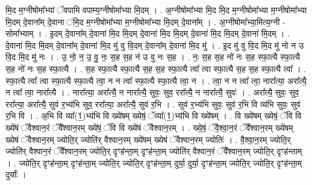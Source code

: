 \documentclass[17pt]{extarticle}
\begin{document}
मि॒द म॒ग्नीषोमा᳚भ्यां ॅवपामि वपाम्य॒ग्नीषोमा᳚भ्या मि॒दम् । . अ॒ग्नीषोमा᳚भ्या मि॒द मि॒द म॒ग्नीषोमा᳚भ्या म॒ग्नीषोमा᳚भ्या मि॒दम् दे॒वाना᳚म् दे॒वाना ॑मि॒द 
म॒ग्नीषोमा᳚भ्या म॒ग्नीषोमा᳚भ्या मि॒दम् दे॒वाना᳚म् । . अ॒ग्नीषोमा᳚भ्या॒मित्य॒ग्नी - सोमा᳚भ्याम् । . इ॒दम् दे॒वाना᳚म् दे॒वाना॑ मि॒द मि॒दम् दे॒वाना॑ मि॒द मि॒दम् दे॒वाना॑ मि॒द मि॒दम् दे॒वाना॑ मि॒दम् । . दे॒वाना॑ मि॒द मि॒दम् दे॒वाना᳚म् दे॒वाना॑ मि॒द मु॑ वु वि॒दम् दे॒वाना᳚म् दे॒वाना॑ मि॒द मु॑ । . इ॒द मु॑ वु वि॒द मि॒द मु॑ नो न उ वि॒द मि॒द मु॑ नः । . उ॒ नो॒ न॒ उ॒ वु॒ नः॒ स॒ह स॒ह न॑ उ वु नः स॒ह । . नः॒ स॒ह स॒ह नो॑ नः स॒ह स्फा॒त्यै स्फा॒त्यै स॒ह नो॑ नः स॒ह स्फा॒त्यै । . स॒ह स्फा॒त्यै स्फा॒त्यै स॒ह स॒ह स्फा॒त्यै त्वा᳚ त्वा स्फा॒त्यै स॒ह स॒ह स्फा॒त्यै त्वा᳚ । . स्फा॒त्यै त्वा᳚ त्वा स्फा॒त्यै स्फा॒त्यै त्वा॒ न न त्वा᳚ स्फा॒त्यै स्फा॒त्यै त्वा॒ न । . त्वा॒ न न त्वा᳚ त्वा॒ नारा᳚त्या॒ अरा᳚त्यै॒ न त्वा᳚ त्वा॒ नारा᳚त्यै । . नारा᳚त्या॒ अरा᳚त्यै॒ न नारा᳚त्यै॒ सुवः॒ सुव॒ ररा᳚त्यै॒ न नारा᳚त्यै॒ सुवः॑ । . अरा᳚त्यै॒ सुवः॒ सुव॒ ररा᳚त्या॒ अरा᳚त्यै॒ सुव॑ र॒भ्य॑भि सुव॒ ररा᳚त्या॒ अरा᳚त्यै॒ सुव॑ र॒भि । . सुव॑ र॒भ्य॑भि सुवः॒ सुव॑ र॒भि वि व्य॑भि सुवः॒ सुव॑ र॒भि वि । . अ॒भि वि व्या᳚(1॒)भ्य॑भि वि ख्ये॑षम् ख्येषं॒ ॅव्या᳚(1॒)भ्य॑भि वि ख्ये॑षम् । . वि ख्ये॑षम् ख्येषं॒ ॅवि वि ख्ये॑षं ॅवैश्वान॒रं ॅवै᳚श्वान॒रम् ख्ये॑षं॒ ॅवि वि ख्ये॑षं ॅवैश्वान॒रम् । . ख्ये॒षं॒ ॅवै॒श्वा॒न॒रं ॅवै᳚श्वान॒रम् ख्ये॑षम् ख्येषं ॅवैश्वान॒रम् ज्योति॒र् ज्योति॑र् वैश्वान॒रम् ख्ये॑षम् ख्येषं ॅवैश्वान॒रम् ज्योतिः॑ । . वै॒श्वा॒न॒रम् ज्योति॒र् ज्योति॑र् वैश्वान॒रं ॅवै᳚श्वान॒रम् ज्योति॒र् दृꣳह॑न्ता॒म् दृꣳह॑न्ता॒म् ज्योति॑र् वैश्वान॒रं ॅवै᳚श्वान॒रम् ज्योति॒र् दृꣳह॑न्ताम् । . ज्योति॒र् दृꣳह॑न्ता॒म् दृꣳह॑न्ता॒म् ज्योति॒र् ज्योति॒र् दृꣳह॑न्ता॒म् दुर्या॒ दुर्या॒ दृꣳह॑न्ता॒म् ज्योति॒र् ज्योति॒र् दृꣳह॑न्ता॒म् दुर्याः᳚ । \newline
\end{document}
